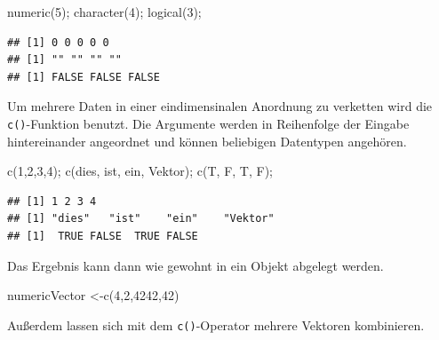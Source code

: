 \documentclass[
]{book}
\newenvironment{Shaded}{\begin{snugshade}}{\end{snugshade}}
\newcommand{\DecValTok}[1]{\textcolor[rgb]{0.00,0.00,0.81}{#1}}
\newcommand{\FunctionTok}[1]{\textcolor[rgb]{0.00,0.00,0.00}{#1}}
\newcommand{\NormalTok}[1]{#1}
\newcommand{\OtherTok}[1]{\textcolor[rgb]{0.56,0.35,0.01}{#1}}
\newcommand{\StringTok}[1]{\textcolor[rgb]{0.31,0.60,0.02}{#1}}
\begin{document}
\begin{Shaded}
\begin{Highlighting}[]
\FunctionTok{numeric}\NormalTok{(}\DecValTok{5}\NormalTok{);}
\FunctionTok{character}\NormalTok{(}\DecValTok{4}\NormalTok{);}
\FunctionTok{logical}\NormalTok{(}\DecValTok{3}\NormalTok{);}
\end{Highlighting}
\end{Shaded}

\begin{verbatim}
## [1] 0 0 0 0 0
## [1] "" "" "" ""
## [1] FALSE FALSE FALSE
\end{verbatim}

Um mehrere Daten in einer eindimensinalen Anordnung zu verketten wird die \texttt{c()}-Funktion benutzt.
Die Argumente werden in Reihenfolge der Eingabe hintereinander angeordnet und können beliebigen Datentypen angehören.

\begin{Shaded}
\begin{Highlighting}[]
\FunctionTok{c}\NormalTok{(}\DecValTok{1}\NormalTok{,}\DecValTok{2}\NormalTok{,}\DecValTok{3}\NormalTok{,}\DecValTok{4}\NormalTok{);}
\FunctionTok{c}\NormalTok{(}\StringTok{\textquotesingle{}dies\textquotesingle{}}\NormalTok{, }\StringTok{\textquotesingle{}ist\textquotesingle{}}\NormalTok{, }\StringTok{\textquotesingle{}ein\textquotesingle{}}\NormalTok{, }\StringTok{\textquotesingle{}Vektor\textquotesingle{}}\NormalTok{);}
\FunctionTok{c}\NormalTok{(T, F, T, F);}
\end{Highlighting}
\end{Shaded}

\begin{verbatim}
## [1] 1 2 3 4
## [1] "dies"   "ist"    "ein"    "Vektor"
## [1]  TRUE FALSE  TRUE FALSE
\end{verbatim}

Das Ergebnis kann dann wie gewohnt in ein Objekt abgelegt werden.

\begin{Shaded}
\begin{Highlighting}[]
\NormalTok{numericVector }\OtherTok{\textless{}{-}}\FunctionTok{c}\NormalTok{(}\DecValTok{4}\NormalTok{,}\DecValTok{2}\NormalTok{,}\DecValTok{4242}\NormalTok{,}\DecValTok{42}\NormalTok{)}
\end{Highlighting}
\end{Shaded}

Außerdem lassen sich mit dem \texttt{c()}-Operator mehrere Vektoren kombinieren.
\end{document}
